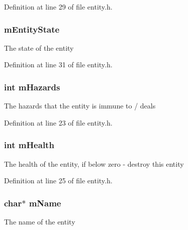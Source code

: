 Definition at line 29 of file entity.\+h.

\subsubsection[{\texorpdfstring{m\+Entity\+State}{mEntityState}}]{ m\+Entity\+State}\hypertarget{structentity__s_aa50a2f30db6a433d25f42fe58ee20995}{}\label{structentity__s_aa50a2f30db6a433d25f42fe58ee20995}
The state of the entity 

Definition at line 31 of file entity.\+h.

\subsubsection[{\texorpdfstring{m\+Hazards}{mHazards}}]{\setlength{\rightskip}{0pt plus 5cm}int m\+Hazards}\hypertarget{structentity__s_a8c5ee6d8b825b6da8ab851320eccd45e}{}\label{structentity__s_a8c5ee6d8b825b6da8ab851320eccd45e}
The hazards that the entity is immune to / deals 

Definition at line 23 of file entity.\+h.

\subsubsection[{\texorpdfstring{m\+Health}{mHealth}}]{\setlength{\rightskip}{0pt plus 5cm}int m\+Health}\hypertarget{structentity__s_a709ed9fa7e17bcc63f51b9e011772aee}{}\label{structentity__s_a709ed9fa7e17bcc63f51b9e011772aee}
The health of the entity, if below zero -\/ destroy this entity 

Definition at line 25 of file entity.\+h.

\subsubsection[{\texorpdfstring{m\+Name}{mName}}]{\setlength{\rightskip}{0pt plus 5cm}char$\ast$ m\+Name}\hypertarget{structentity__s_ad5201d7f075979ee60c684961d6a4ead}{}\label{structentity__s_ad5201d7f075979ee60c684961d6a4ead}
The name of the entity 

